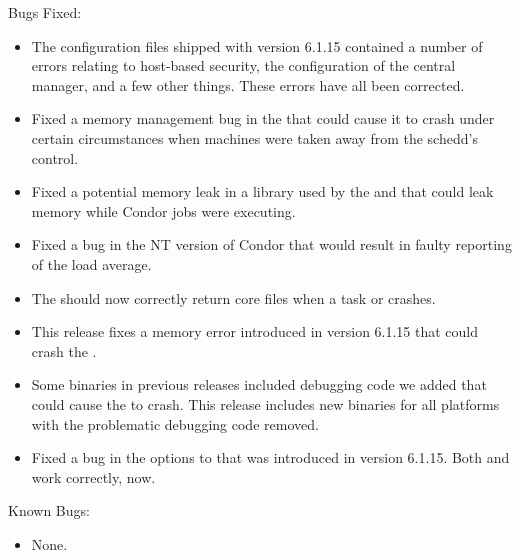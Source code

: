 \noindent Bugs Fixed:

\begin{itemize}

\item The configuration files shipped with version 6.1.15 contained a
number of errors relating to host-based security, the configuration of
the central manager, and a few other things.
These errors have all been corrected.

\item Fixed a memory management bug in the  that could
cause it to crash under certain circumstances when machines were taken
away from the schedd's control.

\item Fixed a potential memory leak in a library used by the
 and  that could leak memory while
Condor jobs were executing.

\item Fixed a bug in the NT version of Condor that would result in
faulty reporting of the load average.

\item The  should now correctly return core files
when a task or  crashes.

\item This release fixes a memory error introduced in version
6.1.15 that could crash the .

\item Some  binaries in previous releases included
debugging code we added that could cause the  to crash.
This release includes new  binaries for all platforms
with the problematic debugging code removed.

\item Fixed a bug in the  options to 
that was introduced in version 6.1.15.
Both  and  work correctly, now.

\end{itemize}

\noindent Known Bugs:

\begin{itemize}

\item None.

\end{itemize}

